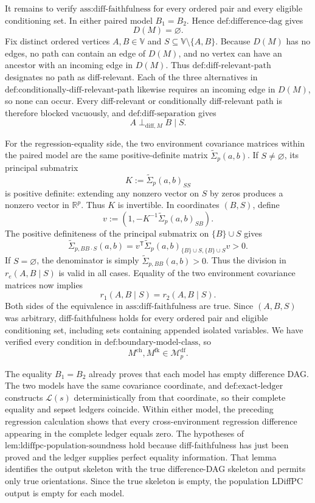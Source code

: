 It remains to verify \(\text{ass:diff-faithfulness}\) for every ordered pair and every eligible conditioning set. In either paired model \(B_1=B_2\). Hence \(\text{def:difference-dag}\) gives
\[
 D(M)=\varnothing.
\]
Fix distinct ordered vertices \(A,B\in\mathbb V\) and \(S\subseteq\mathbb V\setminus\{A,B\}\). Because \(D(M)\) has no edges, no path can contain an edge of \(D(M)\), and no vertex can have an ancestor with an incoming edge in \(D(M)\). Thus \(\text{def:diff-relevant-path}\) designates no path as diff-relevant. Each of the three alternatives in \(\text{def:conditionally-diff-relevant-path}\) likewise requires an incoming edge in \(D(M)\), so none can occur. Every diff-relevant or conditionally diff-relevant path is therefore blocked vacuously, and \(\text{def:diff-separation}\) gives
\[
 A\perp_{\mathrm{diff},M}B\mid S.
\]

For the regression-equality side, the two environment covariance matrices within the paired model are the same positive-definite matrix \(\widetilde\Sigma_p(a,b)\). If \(S\neq\varnothing\), its principal submatrix
\[
 K:=\widetilde\Sigma_p(a,b)_{SS}
\]
is positive definite: extending any nonzero vector on \(S\) by zeros produces a nonzero vector in \(\mathbb R^p\). Thus \(K\) is invertible. In coordinates \((B,S)\), define
\[
 v:=\left(1,-K^{-1}\widetilde\Sigma_p(a,b)_{SB}\right).
\]
The positive definiteness of the principal submatrix on \(\{B\}\cup S\) gives
\[
 \widetilde\Sigma_{p,BB\cdot S}(a,b)
 =v^{\mathsf T}
 \widetilde\Sigma_p(a,b)_{\{B\}\cup S,\{B\}\cup S}v>0.
\]
If \(S=\varnothing\), the denominator is simply \(\widetilde\Sigma_{p,BB}(a,b)>0\). Thus the division in \(r_e(A,B\mid S)\) is valid in all cases. Equality of the two environment covariance matrices now implies
\[
 r_1(A,B\mid S)=r_2(A,B\mid S).
\]
Both sides of the equivalence in \(\text{ass:diff-faithfulness}\) are true. Since \((A,B,S)\) was arbitrary, diff-faithfulness holds for every ordered pair and eligible conditioning set, including sets containing appended isolated variables. We have verified every condition in \(\text{def:boundary-model-class}\), so
\[
 M^{\mathrm{ch}},M^{\mathrm{fk}}\in\mathcal M_p^{\mathrm{df}}.
\]

The equality \(B_1=B_2\) already proves that each model has empty difference DAG. The two models have the same covariance coordinate, and \(\text{def:exact-ledger}\) constructs \(\mathcal L(s)\) deterministically from that coordinate, so their complete equality and sepset ledgers coincide. Within either model, the preceding regression calculation shows that every cross-environment regression difference appearing in the complete ledger equals zero. The hypotheses of \(\text{lem:ldiffpc-population-soundness}\) hold because diff-faithfulness has just been proved and the ledger supplies perfect equality information. That lemma identifies the output skeleton with the true difference-DAG skeleton and permits only true orientations. Since the true skeleton is empty, the population LDiffPC output is empty for each model.

